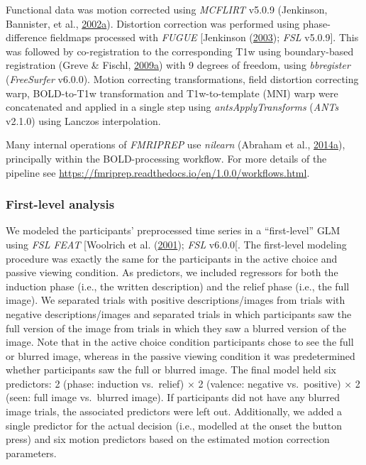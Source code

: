 \documentclass[11pt,american,a4paper,oneside,]{memoir} %
\begin{document}
Functional data was motion corrected using \emph{MCFLIRT} v5.0.9 (Jenkinson, Bannister, et al., \protect\hyperlink{ref-jenkinson2002improved}{2002}\protect\hyperlink{ref-jenkinson2002improved}{a}). Distortion correction was performed using phase-difference fieldmaps processed with \emph{FUGUE} {[}Jenkinson (\protect\hyperlink{ref-jenkinson2003fast}{2003}); \emph{FSL} v5.0.9{]}. This was followed by co-registration to the corresponding T1w using boundary-based registration (Greve \& Fischl, \protect\hyperlink{ref-greve2009accurate}{2009}\protect\hyperlink{ref-greve2009accurate}{a}) with 9 degrees of freedom, using \emph{bbregister} (\emph{FreeSurfer} v6.0.0). Motion correcting transformations, field distortion correcting warp, BOLD-to-T1w transformation and T1w-to-template (MNI) warp were concatenated and applied in a single step using \emph{antsApplyTransforms} (\emph{ANTs} v2.1.0) using Lanczos interpolation.

Many internal operations of \emph{FMRIPREP} use \emph{nilearn} (Abraham et al., \protect\hyperlink{ref-abraham2014machine}{2014}\protect\hyperlink{ref-abraham2014machine}{a}), principally within the BOLD-processing workflow. For more details of the pipeline see \url{https://fmriprep.readthedocs.io/en/1.0.0/workflows.html}.

\hypertarget{morbid-curiosity-methods-imaging-first-level-analysis}{%
\subsubsection{First-level analysis}\label{morbid-curiosity-methods-imaging-first-level-analysis}}

We modeled the participants' preprocessed time series in a ``first-level'' GLM using \emph{FSL FEAT} {[}Woolrich et al. (\protect\hyperlink{ref-woolrich2001temporal}{2001}); \emph{FSL} v6.0.0{[}. The first-level modeling procedure was exactly the same for the participants in the active choice and passive viewing condition. As predictors, we included regressors for both the induction phase (i.e., the written description) and the relief phase (i.e., the full image). We separated trials with positive descriptions/images from trials with negative descriptions/images and separated trials in which participants saw the full version of the image from trials in which they saw a blurred version of the image. Note that in the active choice condition participants chose to see the full or blurred image, whereas in the passive viewing condition it was predetermined whether participants saw the full or blurred image. The final model held six predictors: 2 (phase: induction vs.~relief) × 2 (valence: negative vs.~positive) × 2 (seen: full image vs.~blurred image). If participants did not have any blurred image trials, the associated predictors were left out. Additionally, we added a single predictor for the actual decision (i.e., modelled at the onset the button press) and six motion predictors based on the estimated motion correction parameters.
\end{document}
